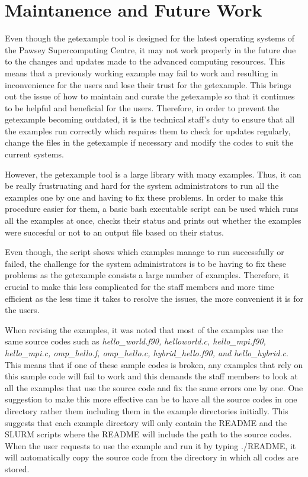 \section{Maintanence and Future Work}

Even though the getexample tool is designed for the latest operating systems of the Pawsey Supercomputing Centre, it may not work properly in the future
due to the changes and updates made to the advanced computing resources. This means that a previously working example may fail to work and resulting in 
inconvenience for the users and lose their trust for the getexample. This brings out the issue of how to maintain and curate the getexample so that it 
continues to be helpful and beneficial for the users. Therefore, in order to prevent the getexample becoming outdated, it is the technical staff's duty 
to ensure that all the examples run correctly which requires them to check for updates regularly, change the files in the getexample if necessary and 
modify the codes to suit the current systems.

However, the getexample tool is a large library with many examples. Thus, it can be really frustruating and hard for the system administrators to run 
all the examples one by one and having to fix these problems. In order to make this procedure easier for them, a basic bash executable script can be 
used which runs all the examples at once, checks their status and prints out whether the examples were succesful or not to an output file based on their
status.

Even though, the script shows which examples manage to run successfully or failed, the challenge for the system administrators is to be having to fix 
these problems as the getexample consists a large number of examples. Therefore, it crucial to make this less complicated for the staff members and more
time efficient as the less time it takes to resolve the issues, the more convenient it is for the users. 

When revising the examples, it was noted that most of the examples use the same source codes such as \emph{hello\_world.f90, helloworld.c, 
hello\_mpi.f90, hello\_mpi.c, omp\_hello.f, omp\_hello.c, hybrid\_hello.f90, and hello\_hybrid.c}. This means that if one of these sample codes is
broken, any examples that rely on this sample code will fail to work and this demands the staff members to look at all the examples that use the source
code and fix the same errors one by one. One suggestion to make this more effective can be to have all the source codes in one directory rather them
including them in the example directories initially. This suggests that each example directory will only contain the README and the SLURM scripts where
the README will include the path to the source codes. When the user requests to use the example and run it by typing ./README, it will automatically
copy the source code from the directory in which all codes are stored.


